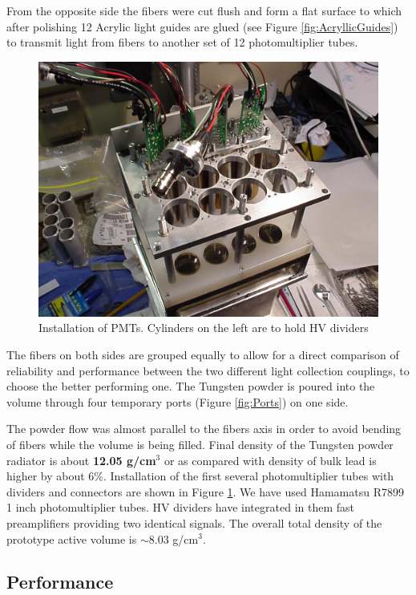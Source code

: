 From the opposite side the fibers were cut flush and form a flat surface to which after polishing 12 Acrylic light guides are glued (see Figure \ref{fig:AcryllicGuides}) to transmit light from fibers to another set of 12 photomultiplier tubes.

\begin{figure}[h]
\centering
\includegraphics[width=0.9\linewidth]{images/Fig9_InstallPMTs.jpg}
\caption{Installation of PMTs. Cylinders on the left are to hold HV dividers}
\label{fig:InstallPMTs}
\end{figure}

The fibers on both sides are grouped equally to allow for a direct comparison of reliability and performance between the two different light collection couplings, to choose the better performing one. The Tungsten powder is poured into the volume through four temporary ports (Figure \ref{fig:Ports}) on one side.

The powder flow was almost parallel to the fibers axis in order to avoid bending of fibers while the volume is being filled. Final density of the Tungsten powder radiator is about \textbf{12.05 g/cm$^3$} or as compared with density of bulk lead is higher by about 6\%. Installation of the first several photomultiplier tubes with dividers and connectors are shown in Figure \ref{fig:InstallPMTs}. We have used Hamamatsu R7899 1 inch photomultiplier tubes. HV dividers have integrated in them fast preamplifiers providing two identical signals. The overall total density of the prototype active volume is $\sim$8.03 g/cm$^3$.

\subsection{Performance}

